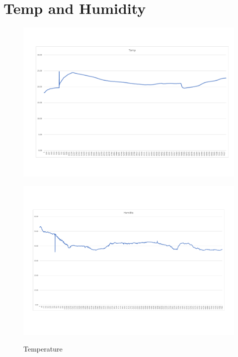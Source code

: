 \section{Temp and Humidity}
\begin{figure}[!htb]
	\includegraphics[width=\textwidth]{body/fig/Temp.pdf}%
\caption{Temperature}
\label{fig:temp}
	\endminipage\hfill
	\includegraphics[width=\textwidth]{body/fig/hum.pdf}%
\label{fig:hum}
	\endminipage\hfill
	
\end{figure}

